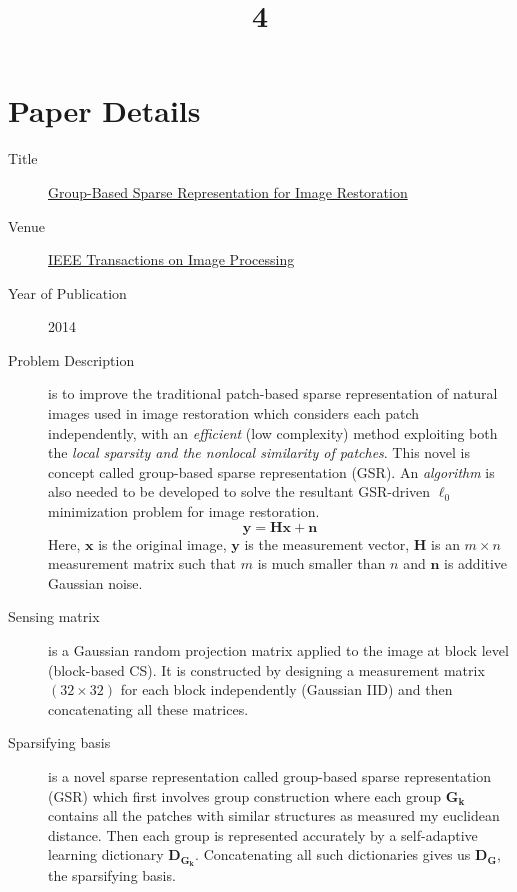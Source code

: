\documentclass[a4paper]{article}
\title{4}
\date{}
\begin{document}
\maketitle
\section{Paper Details}
\begin{description}
	\item[Title] \href{https://ieeexplore.ieee.org/document/6814320}{Group-Based Sparse Representation for Image Restoration}
	\item[Venue] \href{https://ieeexplore.ieee.org/xpl/RecentIssue.jsp?punumber=83}{IEEE Transactions on Image Processing}
	\item[Year of Publication] 2014
	\item[Problem Description] is to improve the traditional patch-based sparse representation of natural images used in image restoration which considers each patch independently, with an \emph{efficient} (low complexity) method exploiting both the \emph{local sparsity and the nonlocal similarity of patches}. This novel is concept called group-based sparse representation (GSR). An \emph{algorithm} is also needed to be developed to solve the resultant GSR-driven $\ell_0$ minimization problem for image restoration.
	\begin{equation}
	\bm{y} = \bm{Hx}+\bm{n}
	\end{equation}
	Here, $\bm{x}$ is the original image, $\bm{y}$ is the measurement vector, $\bm{H}$ is an $m\times n$ measurement matrix such that $m$ is much smaller than $n$ and $\bm{n}$ is additive Gaussian noise.
	\item[Sensing matrix] is a Gaussian random projection matrix applied to the image at block level (block-based CS). It is constructed by designing a measurement matrix $(32\times 32)$ for each block independently (Gaussian IID) and then concatenating all these matrices.
	\item[Sparsifying basis] is a novel sparse representation called group-based sparse representation (GSR) which first involves group construction where each group $\bm{G_k}$ contains all the patches with similar structures as measured my euclidean distance. Then each group is represented accurately by a self-adaptive learning dictionary $\bm{D_{G_k}}$. Concatenating all such dictionaries gives us $\bm{D_G}$, the sparsifying basis.

\end{description}
\end{document}
